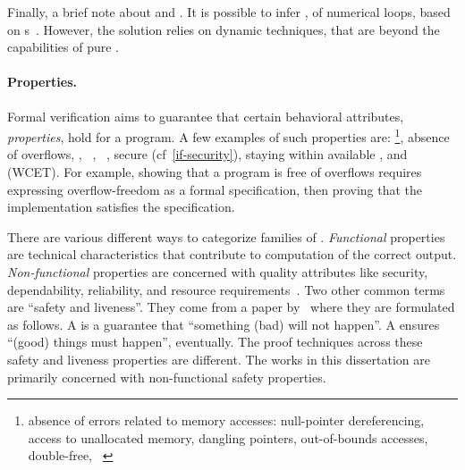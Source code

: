Finally, a brief note about  and . It is
possible to infer , of numerical loops, based on s~\cite{nguyen2017}. However, the solution relies on dynamic
techniques, that are beyond the capabilities of pure .

\paragraph*{Properties.}
Formal verification aims to guarantee that certain
behavioral attributes, \ie \emph{properties}, hold for a program. A few examples
of such properties are: \footnote{\Ie absence of errors
related to memory accesses: null-pointer dereferencing, access to unallocated
memory, dangling pointers, out-of-bounds accesses, double-free,
\etc~\cite{muller2024}}, absence of overflows, , ~\cite{georges2025}, ~\cite{roscoe1987}, secure
 (cf~\autoref{if-security}), staying within available
, and  (WCET). For example,
showing that a program is free of overflows requires expressing overflow-freedom
as a formal specification, then proving that the implementation satisfies the
specification.

There are various different ways to categorize families of .
\emph{Functional} properties are technical
characteristics that contribute to computation of the correct output.
\emph{Non-functional} properties are concerned
with quality attributes like security, dependability, reliability, and resource
requirements~\cite{terbeek2018}. Two other common terms are \enquote{safety
and liveness}. They come from a paper by~\textcite{lamport1977} where they are
formulated as follows. A \emph{} is a guarantee that
\enquote{something (bad) will not happen}. A \emph{}
ensures \enquote{(good) things must happen}, eventually. The proof techniques
across these safety and liveness properties are different. The works in this
dissertation are primarily concerned with non-functional safety properties.

